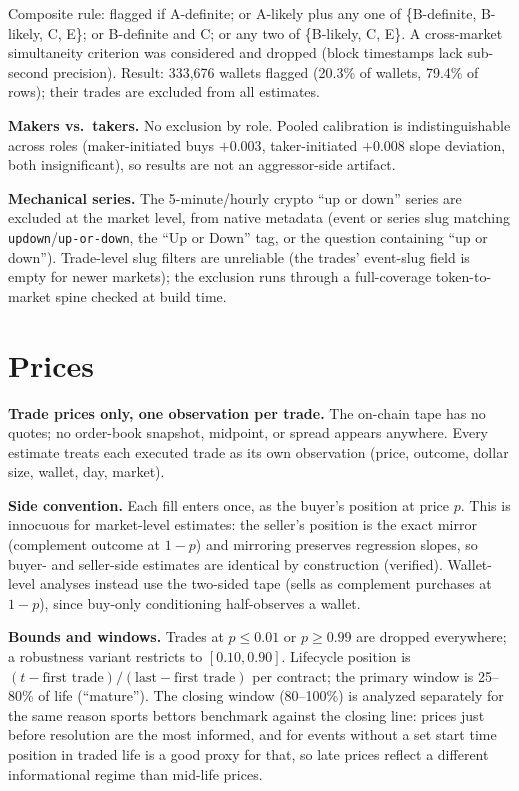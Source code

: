 \documentclass[11pt]{article}
\begin{document}
Composite rule: flagged if A-definite; or A-likely plus any one of
\{B-definite, B-likely, C, E\}; or B-definite and C; or any two of
\{B-likely, C, E\}. A cross-market simultaneity criterion was considered and
dropped (block timestamps lack sub-second precision). Result: 333{,}676
wallets flagged (20.3\% of wallets, 79.4\% of rows); their trades are excluded
from all estimates.

\textbf{Makers vs.\ takers.} No exclusion by role. Pooled calibration is
indistinguishable across roles (maker-initiated buys $+0.003$, taker-initiated
$+0.008$ slope deviation, both insignificant), so results are not an
aggressor-side artifact.

\textbf{Mechanical series.} The 5-minute/hourly crypto ``up or down'' series
are excluded at the market level, from native metadata (event or series slug
matching \texttt{updown}/\texttt{up-or-down}, the ``Up or Down'' tag, or the
question containing ``up or down''). Trade-level slug filters are unreliable
(the trades' event-slug field is empty for newer markets); the exclusion runs
through a full-coverage token-to-market spine checked at build time.

\section{Prices}

\textbf{Trade prices only, one observation per trade.} The on-chain tape has
no quotes; no order-book snapshot, midpoint, or spread appears anywhere.
Every estimate treats each executed trade as its own observation (price,
outcome, dollar size, wallet, day, market).

\textbf{Side convention.} Each fill enters once, as the buyer's position at
price $p$. This is innocuous for market-level estimates: the seller's
position is the exact mirror (complement outcome at $1-p$) and mirroring
preserves regression slopes, so buyer- and seller-side estimates are
identical by construction (verified). Wallet-level analyses instead use the
two-sided tape (sells as complement purchases at $1-p$), since buy-only
conditioning half-observes a wallet.

\textbf{Bounds and windows.} Trades at $p \le 0.01$ or $p \ge 0.99$ are
dropped everywhere; a robustness variant restricts to $[0.10, 0.90]$.
Lifecycle position is $(t - \text{first trade})/(\text{last} -
\text{first trade})$ per contract; the primary window is 25--80\% of life
(``mature''). The closing window (80--100\%) is analyzed separately for the
same reason sports bettors benchmark against the closing line: prices just
before resolution are the most informed, and for events without a set start
time position in traded life is a good proxy for that, so late prices
reflect a different informational regime than mid-life prices.
\end{document}
